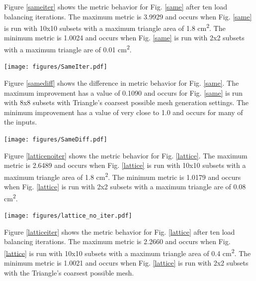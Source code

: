 Figure \ref{sameiter} shows the metric behavior for Fig. \ref{same} after ten load balancing iterations. The maximum metric is 3.9929 and occurs when Fig. \ref{same} is run with 10x10 subsets with a maximum triangle area of 1.8 cm\textsuperscript{2}. The minimum metric is 1.0024 and occurs when Fig. \ref{same} is run with 2x2 subsets with a maximum triangle are of 0.01 cm\textsuperscript{2}.

\noindent\begin{minipage}{\textwidth}
\centering
\texttt{[image: figures/SameIter.pdf]}
\label{sameiter}
\end{minipage}
\smallskip

Figure \ref{samediff} shows the difference in metric behavior for Fig. \ref{same}. The maximum improvement has a value of 0.1090 and occurs for Fig. \ref{same} is run with 8x8 subsets with Triangle's coarsest possible mesh generation settings. The minimum improvement has a value of very close to 1.0 and occurs for many of the inputs. 

\noindent\begin{minipage}{\textwidth}
\centering
\texttt{[image: figures/SameDiff.pdf]}
\label{samediff}
\end{minipage}
\smallskip

Figure \ref{latticenoiter} shows the metric behavior for Fig. \ref{lattice}. The maximum metric is 2.6489 and occurs when Fig. \ref{lattice} is run with 10x10 subsets with a maximum triangle area of 1.8 cm\textsuperscript{2}. The minimum metric is 1.0179 and occurs when Fig. \ref{lattice} is run with 2x2 subsets with a maximum triangle are of 0.08 cm\textsuperscript{2}.

\noindent\begin{minipage}{\textwidth}
\centering
\texttt{[image: figures/lattice\_no\_iter.pdf]}
\label{latticenoiter}
\end{minipage}
\smallskip

Figure \ref{latticeiter} shows the metric behavior for Fig. \ref{lattice} after ten load balancing iterations. The maximum metric is 2.2660 and occurs when Fig. \ref{lattice} is run with 10x10 subsets with a maximum triangle area of 0.4 cm\textsuperscript{2}. The minimum metric is 1.0021 and occurs when Fig. \ref{lattice} is run with 2x2 subsets with the Triangle's coarsest possible mesh.


